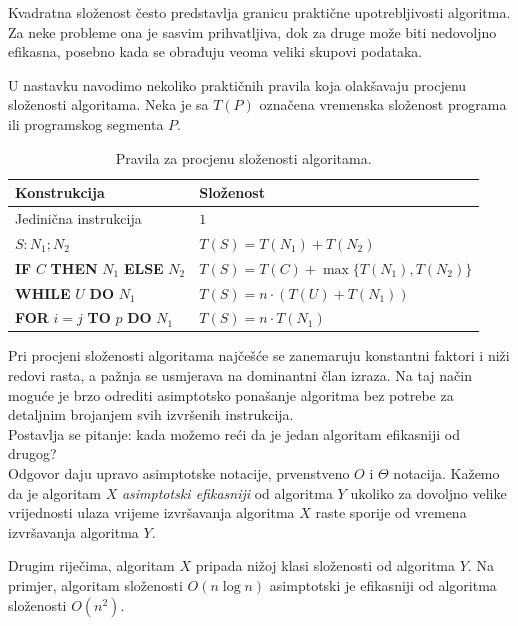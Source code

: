Kvadratna složenost često predstavlja granicu praktične upotrebljivosti algoritma. Za neke probleme ona je sasvim prihvatljiva, dok za druge može biti nedovoljno efikasna, posebno kada se obrađuju veoma veliki skupovi podataka.

U nastavku navodimo nekoliko praktičnih pravila koja olakšavaju procjenu složenosti algoritama. Neka je sa $T(P)$ označena vremenska složenost programa ili programskog segmenta $P$.

\begin{table}[H]
	\caption{Pravila za procjenu složenosti algoritama.}
	\label{tab:uputstva_racunanje}
	\centering
	\begin{tabular}{l|l}
		\hline
		\textbf{Konstrukcija} & \textbf{Složenost} \\
		\hline
		Jedinična instrukcija & $1$ \\
		\hline
		$S: N_1; N_2$ & $T(S)=T(N_1)+T(N_2)$ \\
		\hline
		\textbf{IF} $C$ \textbf{THEN} $N_1$ \textbf{ELSE}  $N_2$ 
		& 
		$T(S)=T(C)+\max\{T(N_1),T(N_2)\}$ \\
		\hline
		\textbf{WHILE} $U$ \textbf{DO} $N_1$
		&
		$T(S)=n\cdot(T(U)+T(N_1))$ \
		\\ \hline
		\textbf{FOR} $i=j$ \textbf{TO} $p$ \textbf{DO} $N_1$
		&
		$T(S)=n\cdot T(N_1)$ \
		\\ \hline
	\end{tabular}
\end{table}

Pri procjeni složenosti algoritama najčešće se zanemaruju konstantni faktori i niži redovi rasta, a pažnja se usmjerava na dominantni član izraza. Na taj način moguće je brzo odrediti asimptotsko ponašanje algoritma bez potrebe za detaljnim brojanjem svih izvršenih instrukcija.\\

Postavlja se pitanje: kada možemo reći da je jedan algoritam efikasniji od drugog?\\


Odgovor daju upravo asimptotske notacije, prvenstveno $O$ i $\Theta$ notacija. Kažemo da je algoritam $X$ \textit{asimptotski efikasniji} od algoritma $Y$ ukoliko za dovoljno velike vrijednosti ulaza vrijeme izvršavanja algoritma $X$ raste sporije od vremena izvršavanja algoritma $Y$.

Drugim riječima, algoritam $X$ pripada nižoj klasi složenosti od algoritma $Y$. Na primjer, algoritam složenosti $O(n\log n)$ asimptotski je efikasniji od algoritma složenosti $O(n^2)$.

